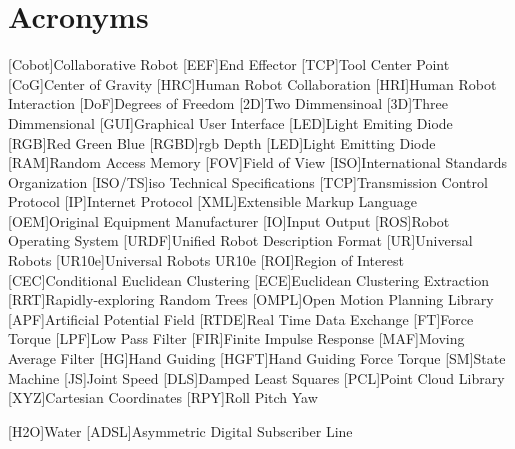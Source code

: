 \chapter{Acronyms}

\footnotesize
\SingleSpacing

\begin{multicols}{2}
\begin{acronym}[AAAAAA]

    [Cobot]{Collaborative Robot}
    [EEF]{End Effector}
    [TCP]{Tool Center Point}
    [CoG]{Center of Gravity}
    [HRC]{Human Robot Collaboration}
    [HRI]{Human Robot Interaction}
    [DoF]{Degrees of Freedom}
    [2D]{Two Dimmensinoal}
    [3D]{Three Dimmensional}
    [GUI]{Graphical User Interface}
    [LED]{Light Emiting Diode}
    [RGB]{Red Green Blue}
    [RGBD]{\acs{rgb} Depth}
    [LED]{Light Emitting Diode}
    [RAM]{Random Access Memory}
    [FOV]{Field of View}
    [ISO]{International Standards Organization}
    [ISO/TS]{\acs{iso} Technical Specifications}
    [TCP]{Transmission Control Protocol}
    [IP]{Internet Protocol}
    [XML]{Extensible Markup Language}
    [OEM]{Original Equipment Manufacturer}
    [IO]{Input Output}
    [ROS]{Robot Operating System}
    [URDF]{Unified Robot Description Format}
    [UR]{Universal Robots}
    [UR10e]{Universal Robots UR10e}
    [ROI]{Region of Interest}
    [CEC]{Conditional Euclidean Clustering}
    [ECE]{Euclidean Clustering Extraction}
    [RRT]{Rapidly-exploring Random Trees}
    [OMPL]{Open Motion Planning Library}
    [APF]{Artificial Potential Field}
    [RTDE]{Real Time Data Exchange}
    [FT]{Force Torque}
    [LPF]{Low Pass Filter}
    [FIR]{Finite Impulse Response}
    [MAF]{Moving Average Filter}
    [HG]{Hand Guiding}
    [HGFT]{Hand Guiding Force Torque}
    [SM]{State Machine}
    [JS]{Joint Speed}
    [DLS]{Damped Least Squares}
    [PCL]{Point Cloud Library}
    [XYZ]{Cartesian Coordinates}
    [RPY]{Roll Pitch Yaw}

	[H2O]{Water}
	[ADSL]{Asymmetric Digital Subscriber Line}

\end{acronym}
\end{multicols}

